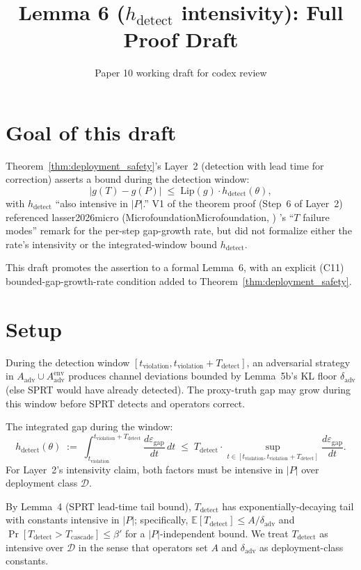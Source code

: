 \documentclass{article}
\title{Lemma 6 ($h_{\mathrm{detect}}$ intensivity): Full Proof Draft}
\author{Paper 10 working draft for codex review}
\date{}
\makeatletter
\newcommand{\citep}[2][]{%
  \begingroup
  \def\@tmpkey{#2}%
  \ifx\@tmpkey\@empty\else
    (\ifx\@empty#1\@empty\else #1, \fi
     \@nameuse{bibkey@\@tmpkey})%
  \fi
  \endgroup
}
\newcommand{\Aadv}{A_{\mathrm{adv}}}
\newcommand{\deltaadv}{\delta_{\mathrm{adv}}}
\newcommand{\Pproxy}{P}
\newcommand{\Ttruth}{T}
\newcommand{\epsgap}{\varepsilon_{\mathrm{gap}}}
\makeatother
\begin{document}
\maketitle

\section{Goal of this draft}

Theorem~\ref{thm:deployment_safety}'s Layer~2 (detection with lead
time for correction) asserts a bound during the detection window:
\[
  |g(\Ttruth) - g(\Pproxy)| \;\leq\; \mathrm{Lip}(g) \cdot
  h_{\mathrm{detect}}(\theta),
\]
with $h_{\mathrm{detect}}$ ``also intensive in $|P|$.''  V1 of the
theorem proof (Step~6 of Layer~2) referenced
\citep[Microfoundation]{lasser2026micro}'s ``$T$ failure modes''
remark for the per-step gap-growth rate, but did not formalize
either the rate's intensivity or the integrated-window bound
$h_{\mathrm{detect}}$.

This draft promotes the assertion to a formal Lemma~6, with an
explicit (C11) bounded-gap-growth-rate condition added to
Theorem~\ref{thm:deployment_safety}.

\section{Setup}

During the detection window $[t_{\mathrm{violation}},
t_{\mathrm{violation}} + T_{\mathrm{detect}}]$, an adversarial
strategy in $\Aadv \cup \Aadv^{\mathrm{env}}$ produces channel
deviations bounded by Lemma~5b's KL floor $\deltaadv$ (else SPRT
would have already detected).  The proxy-truth gap may grow during
this window before SPRT detects and operators correct.

The integrated gap during the window:
\[
  h_{\mathrm{detect}}(\theta) \;:=\;
  \int_{t_{\mathrm{violation}}}^{t_{\mathrm{violation}} +
  T_{\mathrm{detect}}}
  \frac{d \epsgap}{dt} \, dt
  \;\leq\;
  T_{\mathrm{detect}} \cdot \sup_{t \in
  [t_{\mathrm{violation}}, t_{\mathrm{violation}} +
  T_{\mathrm{detect}}]}
  \frac{d \epsgap}{dt}.
\]
For Layer~2's intensivity claim, both factors must be intensive in
$|P|$ over deployment class $\mathcal{D}$.

By Lemma~4 (SPRT lead-time tail bound), $T_{\mathrm{detect}}$ has
exponentially-decaying tail with constants intensive in $|P|$;
specifically, $\mathbb{E}[T_{\mathrm{detect}}] \leq A/\deltaadv$
and $\Pr[T_{\mathrm{detect}} > T_{\mathrm{cascade}}] \leq \beta'$
for a $|P|$-independent bound.  We treat $T_{\mathrm{detect}}$ as
intensive over $\mathcal{D}$ in the sense that operators set $A$
and $\deltaadv$ as deployment-class constants.
\end{document}
